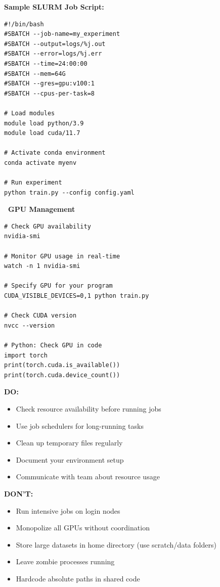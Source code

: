 \documentclass[11pt,a4paper]{article}
\begin{document}
\textbf{Sample SLURM Job Script:}

\begin{lstlisting}[style=bashstyle, caption=job\_script.sh]
#!/bin/bash
#SBATCH --job-name=my_experiment
#SBATCH --output=logs/%j.out
#SBATCH --error=logs/%j.err
#SBATCH --time=24:00:00
#SBATCH --mem=64G
#SBATCH --gres=gpu:v100:1
#SBATCH --cpus-per-task=8

# Load modules
module load python/3.9
module load cuda/11.7

# Activate conda environment
conda activate myenv

# Run experiment
python train.py --config config.yaml
\end{lstlisting}

\textbf{\faMicrochip~GPU Management}

\begin{lstlisting}[style=bashstyle]
# Check GPU availability
nvidia-smi

# Monitor GPU usage in real-time
watch -n 1 nvidia-smi

# Specify GPU for your program
CUDA_VISIBLE_DEVICES=0,1 python train.py

# Check CUDA version
nvcc --version

# Python: Check GPU in code
import torch
print(torch.cuda.is_available())
print(torch.cuda.device_count())
\end{lstlisting}

\begin{tcolorbox}[colback=red!5,colframe=red!40,title={\faExclamationTriangle~Server Etiquette}]
\textbf{DO:}
\begin{itemize}
    \item Check resource availability before running jobs
    \item Use job schedulers for long-running tasks
    \item Clean up temporary files regularly
    \item Document your environment setup
    \item Communicate with team about resource usage
\end{itemize}

\textbf{DON'T:}
\begin{itemize}
    \item Run intensive jobs on login nodes
    \item Monopolize all GPUs without coordination
    \item Store large datasets in home directory (use scratch/data folders)
    \item Leave zombie processes running
    \item Hardcode absolute paths in shared code
\end{itemize}
\end{tcolorbox}
\end{document}
